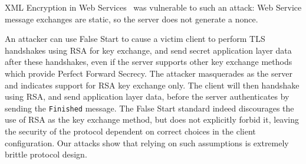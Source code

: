 %

XML Encryption in Web Services~\cite{Jager2012} was vulnerable to such an attack: Web Service message exchanges are static, so the server does not generate a nonce.
\fi

An attacker can use False Start to cause a victim client to perform TLS handshakes using RSA for key exchange\ifext, and send secret application layer data after these handshakes\fi, even if the server supports other key exchange methods which provide Perfect Forward Secrecy. The attacker masquerades as the server and indicates support for RSA key exchange only. The client will then handshake using RSA, and send application layer data, before the server authenticates by sending the \texttt{Finished} message. The False Start standard indeed discourages the use of RSA as the key exchange method, but does not explicitly forbid it, leaving the security of the protocol dependent on correct choices in the client configuration. Our attacks show that relying on such assumptions is extremely brittle protocol design.

